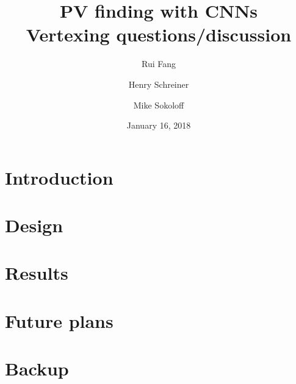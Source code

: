 \documentclass[aspectratio=169, 10pt]{beamer}
\title[PV finding with CNNs: Vertexing questions/discussion]{PV finding with CNNs\\{\small Vertexing questions/discussion}}
\author[Fang, Schreiner, Sokoloff]{Rui Fang \and Henry Schreiner \and Mike Sokoloff}
\institute{The University of Cincinnati}
\date{January 16, 2018}
\begin{document}
\begin{frame}
\titlepage
\end{frame}

\section{Introduction}


\section{Design}


\section{Results}


\section{Future plans}


\backupbegin
\section{Backup}

\backupend
\end{document}
